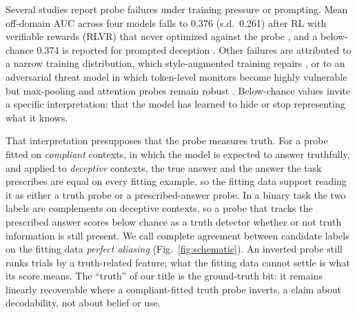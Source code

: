 \documentclass{article}
\begin{document}
Several studies report probe failures under training pressure or prompting. Mean off-domain AUC across four models falls to 0.376 (s.d.\ 0.261) after RL with verifiable rewards (RLVR) that never optimized against the probe \citep{obfuscationatlas2026}, and a below-chance 0.374 is reported for prompted deception \citep{oneprobe2026}. Other failures are attributed to a narrow training distribution, which style-augmented training repairs \citep{pressuretesting2026}, or to an adversarial threat model in which token-level monitors become highly vulnerable but max-pooling and attention probes remain robust \citep{rlobfuscation2025}. Below-chance values invite a specific interpretation: that the model has learned to hide or stop representing what it knows.

That interpretation presupposes that the probe measures truth. For a probe fitted on \emph{compliant} contexts, in which the model is expected to answer truthfully, and applied to \emph{deceptive} contexts, the true answer and the answer the task prescribes are equal on every fitting example, so the fitting data support reading it as either a truth probe or a prescribed-answer probe. In a binary task the two labels are complements on deceptive contexts, so a probe that tracks the prescribed answer scores below chance as a truth detector whether or not truth information is still present. We call complete agreement between candidate labels on the fitting data \emph{perfect aliasing} (Fig.~\ref{fig:schematic}). An inverted probe still ranks trials by a truth-related feature; what the fitting data cannot settle is what its score means. The ``truth'' of our title is the ground-truth bit: it remains linearly recoverable where a compliant-fitted truth probe inverts, a claim about decodability, not about belief or use.
\end{document}
